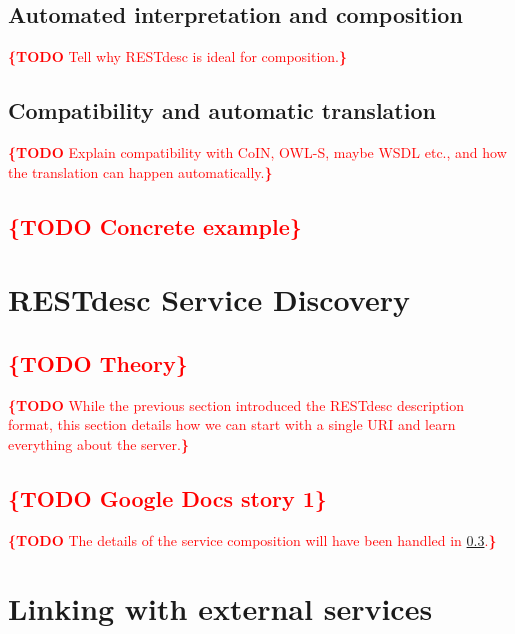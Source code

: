 \documentclass[runningheads,a4paper, twocolumn]{llncs}
\newcommand{\todo}[1]{\noindent\textcolor{red}{{\bf \{TODO} #1{\bf \}}}}
\begin{document}
\subsection{Automated interpretation and composition}
\todo{Tell why RESTdesc is ideal for composition.}


\subsection{Compatibility and automatic translation}
\todo{Explain compatibility with CoIN, OWL-S, maybe WSDL etc., and how the translation can happen automatically.}

\subsection{\todo{Concrete example}}
\label{CompositionExample}



\section{RESTdesc Service Discovery}
\subsection{\todo{Theory}}
\todo{While the previous section introduced the RESTdesc description format, this section details how we can start with a single URI and learn everything about the server.}

\subsection{\todo{Google Docs story 1}}
\todo{The details of the service composition will have been handled in \ref{CompositionExample}.}


\section{Linking with external services}
\end{document}
